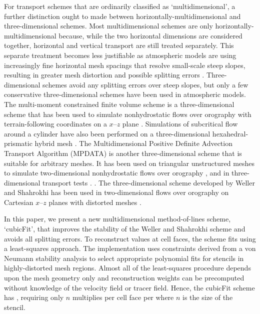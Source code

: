 For transport schemes that are ordinarily classified as `multidimensional', a further distinction ought to made between horizontally-multidimensional and three-dimensional schemes.
Most multidimensional schemes are only horizontally-multidimensional because, while the two horizontal dimensions are considered together, horizontal and vertical transport are still treated separately.
This separate treatment becomes less justifiable as atmospheric models are using increasingly fine horizontal mesh spacings that resolve small-scale steep slopes, resulting in greater mesh distortion and possible splitting errors \citep{kent2014}.
Three-dimensional schemes avoid any splitting errors over steep slopes, but only a few conservative three-dimensional schemes have been used in atmospheric models.
The multi-moment constrained finite volume scheme \citep{ii-xiao2009} is a three-dimensional scheme that has been used to simulate nonhydrostatic flows over orography with terrain-following coordinates on a $x$--$z$ plane \citep{li2013}.  Simulations of subcritical flow around a cylinder have also been performed on a three-dimensional hexahedral-prismatic hybrid mesh \citep{xie-xiao2016}.
The Multidimensional Positive Definite Advection Transport Algorithm (MPDATA) is another three-dimensional scheme that is suitable for arbitrary meshes.
It has been used on triangular unstructured meshes to simulate two-dimensional nonhydrostatic flows over orography \citep{smolarkiewicz-szmelter2011}, and in three-dimensional transport tests \citep{smolarkiewicz-szmelter2005}. 
.
The three-dimensional scheme developed by Weller and Shahrokhi \citep{weller-shahrokhi2014} has been used in two-dimensional flows over orography on Cartesian $x$--$z$ planes with distorted meshes \citep{shaw-weller2016,weller2017}.

In this paper, we present a new multidimensional method-of-lines scheme, `cubicFit', that improves the stability of the Weller and Shahrokhi scheme \citep{weller-shahrokhi2014} and avoids all splitting errors.  To reconstruct values at cell faces, the scheme fits  using a least-squares approach.  The implementation uses constraints derived from a von Neumann stability analysis to select appropriate polynomial fits for stencils in highly-distorted mesh regions.  Almost all of the least-squares procedure depends upon the mesh geometry only and reconstruction weights can be precomputed without knowledge of the velocity field or tracer field.
Hence, the cubicFit scheme has , requiring only $n$ multiplies per cell face per  where $n$ is the size of the stencil.  

